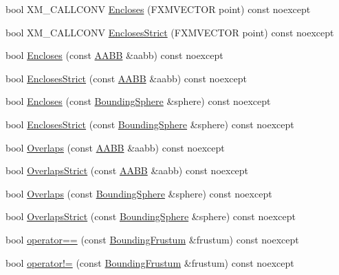 \begin{DoxyCompactItemize}
\item 
bool X\+M\+\_\+\+C\+A\+L\+L\+C\+O\+NV \mbox{\hyperlink{classmage_1_1_bounding_frustum_adde03968d4a4f519c9b9af3b3434055f}{Encloses}} (F\+X\+M\+V\+E\+C\+T\+OR point) const noexcept
\item 
bool X\+M\+\_\+\+C\+A\+L\+L\+C\+O\+NV \mbox{\hyperlink{classmage_1_1_bounding_frustum_a7cd247470d192464f006b2b76ad3c336}{Encloses\+Strict}} (F\+X\+M\+V\+E\+C\+T\+OR point) const noexcept
\item 
bool \mbox{\hyperlink{classmage_1_1_bounding_frustum_a09642eff00ef33d0b5ea4890c9adc4b2}{Encloses}} (const \mbox{\hyperlink{classmage_1_1_a_a_b_b}{A\+A\+BB}} \&aabb) const noexcept
\item 
bool \mbox{\hyperlink{classmage_1_1_bounding_frustum_aacdbcc48558489bec9ad87d52104626d}{Encloses\+Strict}} (const \mbox{\hyperlink{classmage_1_1_a_a_b_b}{A\+A\+BB}} \&aabb) const noexcept
\item 
bool \mbox{\hyperlink{classmage_1_1_bounding_frustum_a64bb28f632ae39438424a714809c31de}{Encloses}} (const \mbox{\hyperlink{classmage_1_1_bounding_sphere}{Bounding\+Sphere}} \&sphere) const noexcept
\item 
bool \mbox{\hyperlink{classmage_1_1_bounding_frustum_ae3dce877ac0e87dd6b9f7f8644c8bcfc}{Encloses\+Strict}} (const \mbox{\hyperlink{classmage_1_1_bounding_sphere}{Bounding\+Sphere}} \&sphere) const noexcept
\item 
bool \mbox{\hyperlink{classmage_1_1_bounding_frustum_a0fbd4639f1bd0a014430313410aa013d}{Overlaps}} (const \mbox{\hyperlink{classmage_1_1_a_a_b_b}{A\+A\+BB}} \&aabb) const noexcept
\item 
bool \mbox{\hyperlink{classmage_1_1_bounding_frustum_af3a6772edd09480a22a175fa4acbfbd8}{Overlaps\+Strict}} (const \mbox{\hyperlink{classmage_1_1_a_a_b_b}{A\+A\+BB}} \&aabb) const noexcept
\item 
bool \mbox{\hyperlink{classmage_1_1_bounding_frustum_a2133c3a7187369772e82b7e229b0e683}{Overlaps}} (const \mbox{\hyperlink{classmage_1_1_bounding_sphere}{Bounding\+Sphere}} \&sphere) const noexcept
\item 
bool \mbox{\hyperlink{classmage_1_1_bounding_frustum_a070075ad4af9935b7b60e7e5345d0aff}{Overlaps\+Strict}} (const \mbox{\hyperlink{classmage_1_1_bounding_sphere}{Bounding\+Sphere}} \&sphere) const noexcept
\item 
bool \mbox{\hyperlink{classmage_1_1_bounding_frustum_a90c5a355878674b1320e195318703d4b}{operator==}} (const \mbox{\hyperlink{classmage_1_1_bounding_frustum}{Bounding\+Frustum}} \&frustum) const noexcept
\item 
bool \mbox{\hyperlink{classmage_1_1_bounding_frustum_a20c545cb807db2dc2fad018229f69c2c}{operator!=}} (const \mbox{\hyperlink{classmage_1_1_bounding_frustum}{Bounding\+Frustum}} \&frustum) const noexcept
\end{DoxyCompactItemize}
